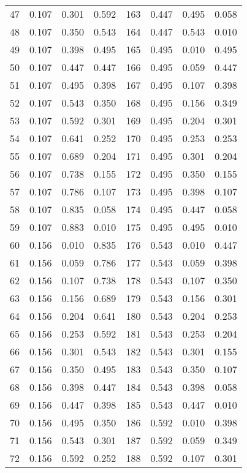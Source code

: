 \documentclass[journal=mamobx,manuscript=suppinfo]{achemso}
\begin{document}
\begin{longtable}{cccc|cccc}
47 & 0.107 & 0.301 & 0.592  & 163 & 0.447 & 0.495 & 0.058 \\
48 & 0.107 & 0.350 & 0.543  & 164 & 0.447 & 0.543 & 0.010 \\
49 & 0.107 & 0.398 & 0.495  & 165 & 0.495 & 0.010 & 0.495 \\
50 & 0.107 & 0.447 & 0.447  & 166 & 0.495 & 0.059 & 0.447 \\
51 & 0.107 & 0.495 & 0.398  & 167 & 0.495 & 0.107 & 0.398 \\
52 & 0.107 & 0.543 & 0.350  & 168 & 0.495 & 0.156 & 0.349 \\
53 & 0.107 & 0.592 & 0.301  & 169 & 0.495 & 0.204 & 0.301 \\
54 & 0.107 & 0.641 & 0.252  & 170 & 0.495 & 0.253 & 0.253 \\
55 & 0.107 & 0.689 & 0.204  & 171 & 0.495 & 0.301 & 0.204 \\
56 & 0.107 & 0.738 & 0.155  & 172 & 0.495 & 0.350 & 0.155 \\
57 & 0.107 & 0.786 & 0.107  & 173 & 0.495 & 0.398 & 0.107 \\
58 & 0.107 & 0.835 & 0.058  & 174 & 0.495 & 0.447 & 0.058 \\
59 & 0.107 & 0.883 & 0.010  & 175 & 0.495 & 0.495 & 0.010 \\
60 & 0.156 & 0.010 & 0.835  & 176 & 0.543 & 0.010 & 0.447 \\
61 & 0.156 & 0.059 & 0.786  & 177 & 0.543 & 0.059 & 0.398 \\
62 & 0.156 & 0.107 & 0.738  & 178 & 0.543 & 0.107 & 0.350 \\
63 & 0.156 & 0.156 & 0.689  & 179 & 0.543 & 0.156 & 0.301 \\
64 & 0.156 & 0.204 & 0.641  & 180 & 0.543 & 0.204 & 0.253 \\
65 & 0.156 & 0.253 & 0.592  & 181 & 0.543 & 0.253 & 0.204 \\
66 & 0.156 & 0.301 & 0.543  & 182 & 0.543 & 0.301 & 0.155 \\
67 & 0.156 & 0.350 & 0.495  & 183 & 0.543 & 0.350 & 0.107 \\
68 & 0.156 & 0.398 & 0.447  & 184 & 0.543 & 0.398 & 0.058 \\
69 & 0.156 & 0.447 & 0.398  & 185 & 0.543 & 0.447 & 0.010 \\
70 & 0.156 & 0.495 & 0.350  & 186 & 0.592 & 0.010 & 0.398 \\
71 & 0.156 & 0.543 & 0.301  & 187 & 0.592 & 0.059 & 0.349 \\
72 & 0.156 & 0.592 & 0.252  & 188 & 0.592 & 0.107 & 0.301 \\

\end{longtable}
\end{document}

